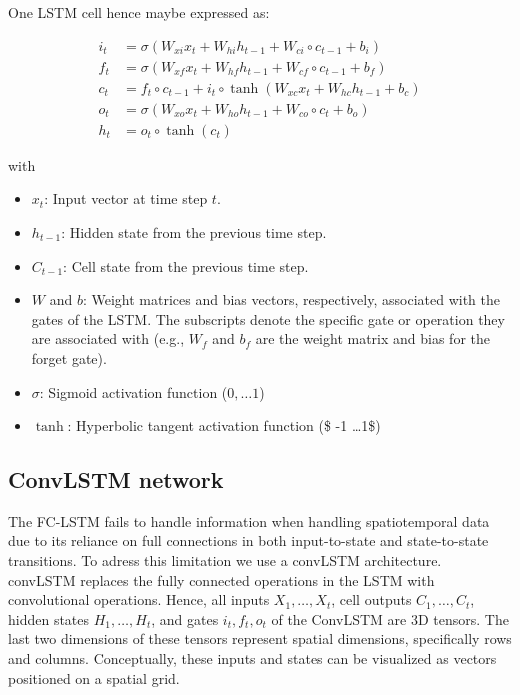 \documentclass[
]{agujournal2019}
\providecommand{\tightlist}{%
  \setlength{\itemsep}{0pt}\setlength{\parskip}{0pt}}\usepackage{longtable,booktabs,array}
\begin{document}
One LSTM cell hence maybe expressed as:

\[
\begin{aligned}
i_t &= \sigma(W_{xi} x_t + W_{hi} h_{t-1} + W_{ci} \circ c_{t-1} + b_i) \\
f_t &= \sigma(W_{xf} x_t + W_{hf} h_{t-1} + W_{cf} \circ c_{t-1} + b_f) \\
c_t &= f_t \circ c_{t-1} + i_t \circ \tanh(W_{xc} x_t + W_{hc} h_{t-1} + b_c) \\
o_t &= \sigma(W_{xo} x_t + W_{ho} h_{t-1} + W_{co} \circ c_t + b_o) \\
h_t &= o_t \circ \tanh(c_t)
\end{aligned}
\]

with

\begin{itemize}
\tightlist
\item
  \(x_t\): Input vector at time step \(t\).
\item
  \(h_{t-1}\): Hidden state from the previous time step.
\item
  \(C_{t-1}\): Cell state from the previous time step.
\item
  \(W\) and \(b\): Weight matrices and bias vectors, respectively,
  associated with the gates of the LSTM. The subscripts denote the
  specific gate or operation they are associated with (e.g., \(W_f\) and
  \(b_f\) are the weight matrix and bias for the forget gate).
\item
  \(\sigma\): Sigmoid activation function (\(0,\ldots 1\))
\item
  \(\tanh\): Hyperbolic tangent activation function (\$ -1 \ldots 1\$)
\end{itemize}

\hypertarget{convlstm-network}{%
\subsection{ConvLSTM network}\label{convlstm-network}}

The FC-LSTM fails to handle information when handling spatiotemporal
data due to its reliance on full connections in both input-to-state and
state-to-state transitions. To adress this limitation we use a convLSTM
architecture. convLSTM replaces the fully connected operations in the
LSTM with convolutional operations. Hence, all inputs
\(X_1, \ldots, X_t\), cell outputs \(C_1, \ldots, C_t\), hidden states
\(H_1, \ldots, H_t\), and gates \(i_t, f_t, o_t\) of the ConvLSTM are 3D
tensors. The last two dimensions of these tensors represent spatial
dimensions, specifically rows and columns. Conceptually, these inputs
and states can be visualized as vectors positioned on a spatial grid.
\end{document}
